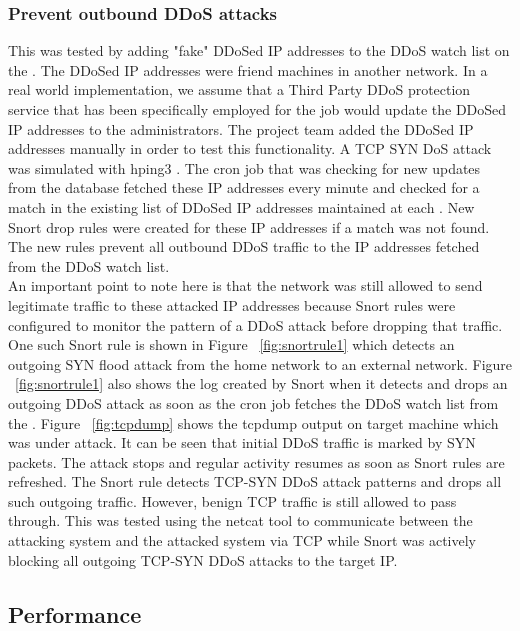 \subsubsection{Prevent outbound DDoS attacks}
\label{sec:eval:outddos}

This was tested by adding "fake" DDoSed IP addresses to the DDoS watch list on the \servname. The DDoSed IP addresses were friend machines in another network. In a real world implementation, we assume that a Third Party DDoS protection service \cite{DDoSPreventionTools} that has been specifically employed for the job would update the DDoSed IP addresses to the \sysname administrators. The project team added the DDoSed IP addresses manually in order to test this functionality. A TCP SYN DoS attack was simulated with hping3 \cite{hpingReferralPaper} \cite{hping}.  The cron job that was checking for new updates from the database fetched these IP addresses every minute and checked for a match in the existing list of DDoSed IP addresses maintained at each \nodename. New Snort drop rules were created for these IP addresses if a match was not found. The new rules prevent all outbound DDoS traffic to the IP addresses fetched from the DDoS watch list. \\

An important point to note here is that the network was still allowed to send legitimate traffic to these attacked IP addresses because Snort rules were configured to monitor the pattern of a DDoS attack before dropping that traffic. One such Snort rule is shown in Figure ~\ref{fig:snortrule1} which detects an outgoing SYN flood attack from the home network to an external network. Figure ~\ref{fig:snortrule1} also shows the log created by Snort when it detects and drops an outgoing DDoS attack as soon as the cron job fetches the DDoS watch list from the \servname. Figure ~\ref{fig:tcpdump} shows the tcpdump output on target machine which was under attack. It can be seen that initial DDoS traffic is marked by SYN packets. The attack stops and regular activity resumes as soon as Snort rules are refreshed. The Snort rule detects TCP-SYN DDoS attack patterns and drops all such outgoing traffic. However, benign TCP traffic is still allowed to pass through. This was tested using the netcat tool \cite{netcat} to communicate between the attacking system and the attacked system via TCP while Snort was actively blocking all outgoing TCP-SYN DDoS attacks to the target IP.

\subsection{Performance}
